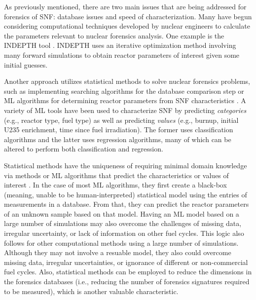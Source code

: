 As previously mentioned, there are two main issues that are being addressed for
forensics of \gls{SNF}: database issues and speed of characterization.  Many
have begun considering computational techniques developed by nuclear engineers
to calculate the parameters relevant to nuclear forensics analysis.  One
example is the \gls{INDEPTH} tool \cite{weber_2006, weber_2010, weber_2011}.
\gls{INDEPTH} uses an iterative optimization method involving many forward
simulations to obtain reactor parameters of interest given some initial
guesses. 

Another approach utilizes statistical methods to solve nuclear forensics
problems, such as implementing searching algorithms for the database comparison
step \cite{gey_search} or \gls{ML} algorithms for determining reactor
parameters from \gls{SNF} characteristics \cite{dayman_feasibility_2013,
nicolaou_2006, nicolaou_2009, nicolaou_2014, robel_2009, pu_discrimination,
jones_viz_2014, jones_snf_2014, mll_method, mll_sensitivity, mll_validate}.  A
variety of \gls{ML} tools have been used to characterize \gls{SNF} by
predicting \emph{categories} (e.g., reactor type, fuel type) as well as
predicting \emph{values} (e.g., burnup, initial \gls{U235} enrichment, time
since fuel irradiation).  The former uses classification algorithms and the
latter uses regression algorithms, many of which can be altered to perform both
classification and regression. 

Statistical methods have the uniqueness of requiring minimal domain knowledge
via methods or \gls{ML} algorithms that predict the characteristics or values
of interest \cite{dayman_feasibility_2013, pu_discrimination, robel_2009,
nicolaou_2006, nicolaou_2009, nicolaou_2014, jones_snf_2014, jones_viz_2014,
mll_method, mll_sensitivity, mll_validate}.  In the case of most \gls{ML}
algorithms, they first create a black-box (meaning, unable to be
human-interpreted) statistical model using the entries of measurements in a
database. From that, they can predict the reactor parameters of an unknown
sample based on that model.  Having an \gls{ML} model based on a large number
of simulations may also overcome the challenges of missing data, irregular
uncertainty, or lack of information on other fuel cycles.  This logic also
follows for other computational methods using a large number of simulations.
Although they may not involve a resuable model, they also could overcome
missing data, irregular uncertainties, or ignorance of different or
non-commercial fuel cycles.  Also, statistical methods can be employed to
reduce the dimensions in the forensics databases (i.e., reducing the number of
forensics signatures required to be measured), which is another valuable
characteristic.
